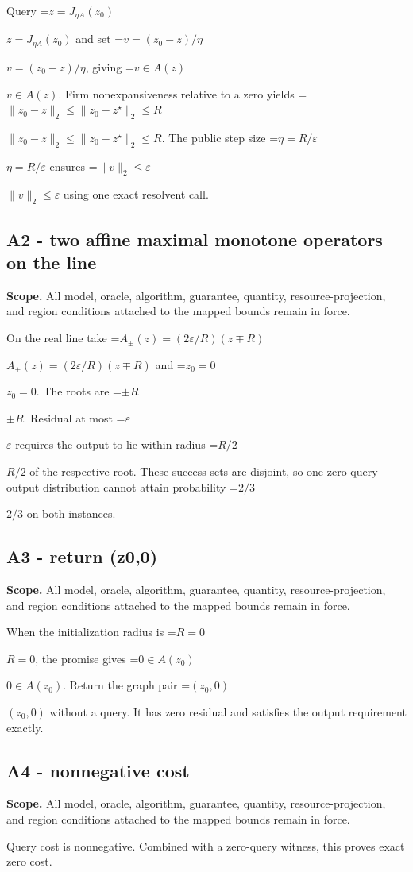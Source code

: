 \documentclass[10pt,a4paper]{article}
\newcommand{\AtlasMath}[1]{\par\begingroup\centering\setbox0=\hbox{$\displaystyle #1$}\ifdim\wd0>1.4\linewidth\typeout{ATLAS WIDE FORMULA: \the\wd0}\fi\ifdim\wd0>\linewidth\resizebox{\linewidth}{!}{\box0}\else\box0\fi\par\endgroup}
\newcommand{\AtlasInlineMath}[1]{\begingroup\setbox0=\hbox{$#1$}\ifdim\wd0>.4\linewidth\endgroup\AtlasMath{#1}\else\endgroup$#1$\fi}
\begin{document}
Query \AtlasInlineMath{z=J_{\eta A}(z_0)} and set \AtlasInlineMath{v=(z_0-z)/\eta}, giving \AtlasInlineMath{v\in A(z)}. Firm nonexpansiveness relative to a zero yields \AtlasInlineMath{\|z_0-z\|_2\le\|z_0-z^\star\|_2\le R}. The public step size \AtlasInlineMath{\eta=R/\varepsilon} ensures \AtlasInlineMath{\|v\|_2\le\varepsilon} using one exact resolvent call.

\subsection{A2 - two affine maximal monotone operators on the line}
\textbf{Scope.} All model, oracle, algorithm, guarantee, quantity, resource-projection, and region conditions attached to the mapped bounds remain in force.

On the real line take \AtlasInlineMath{A_\pm(z)=(2\varepsilon/R)(z\mp R)} and \AtlasInlineMath{z_0=0}. The roots are \AtlasInlineMath{\pm R}. Residual at most \AtlasInlineMath{\varepsilon} requires the output to lie within radius \AtlasInlineMath{R/2} of the respective root. These success sets are disjoint, so one zero-query output distribution cannot attain probability \AtlasInlineMath{2/3} on both instances.

\subsection{A3 - return (z0,0)}
\textbf{Scope.} All model, oracle, algorithm, guarantee, quantity, resource-projection, and region conditions attached to the mapped bounds remain in force.

When the initialization radius is \AtlasInlineMath{R=0}, the promise gives \AtlasInlineMath{0\in A(z_0)}. Return the graph pair \AtlasInlineMath{(z_0,0)} without a query. It has zero residual and satisfies the output requirement exactly.

\subsection{A4 - nonnegative cost}
\textbf{Scope.} All model, oracle, algorithm, guarantee, quantity, resource-projection, and region conditions attached to the mapped bounds remain in force.

Query cost is nonnegative. Combined with a zero-query witness, this proves exact zero cost.
\end{document}
